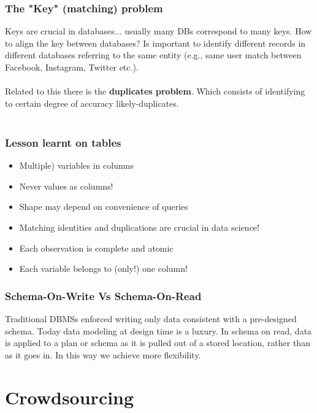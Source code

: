 \documentclass[10pt,a4paper]{article}
\newcommand{\nline}{\\~\\}
\begin{document}
 \subsubsection{The "Key" (matching) problem}
 Keys are crucial in databases... usually many DBs correspond to many keys. How to align the key between databases? Is important to identify different records in different databases referring to the same entity (e.g., same user match between Facebook, Instagram, Twitter etc.).
 \nline
 Related to this there is the \textbf{duplicates problem}. Which consists of identifying to certain degree of accuracy likely-duplicates. \nline
 \subsubsection{Lesson learnt on tables}
 \begin{itemize}
 	\item Multiple) variables in columns
 	\item Never values as columns!
 	\item Shape may depend on convenience of queries
 	\item Matching identities and duplications are crucial in data science!
 	\item Each observation is complete and atomic
 	\item Each variable belongs to (only!) one column!
 \end{itemize} 
\subsubsection{Schema-On-Write Vs Schema-On-Read}
Traditional DBMSs enforced writing only data consistent with a pre-designed schema. Today data modeling at design time is a luxury.
In schema on read, data is applied to a plan or schema as it is pulled out of a stored location, rather than as it goes in. In this way we achieve more flexibility.

\pagebreak 

\section{Crowdsourcing}

\clearpage


  
\end{document}

